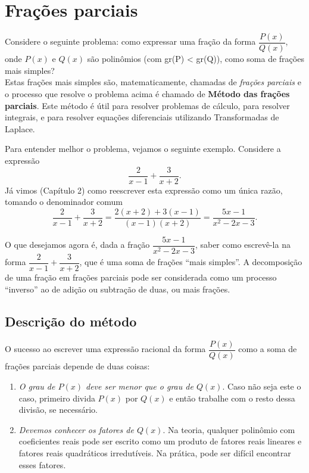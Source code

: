 \chapter{Frações parciais}

Considere o seguinte problema:  como expressar uma fração da forma $\dfrac{P(x)}{Q(x)}$, onde $P(x)$ e $Q(x)$ são polinômios (com gr(P) < gr(Q)), como soma de frações mais simples? \\

Estas frações mais simples são, matematicamente, chamadas de \textit{frações parciais} e o processo que resolve o problema acima é chamado de \textbf{Método das frações parciais}. Este método é útil para resolver problemas de cálculo, para resolver integrais, e para resolver equações diferenciais utilizando Transformadas de Laplace. 

Para entender melhor o problema, vejamos o seguinte exemplo. Considere a expressão
\begin{equation*}
    \frac{2}{x-1}+\frac{3}{x+2}.
\end{equation*}
Já vimos (Capítulo 2) como reescrever esta expressão como um única razão, tomando o denominador comum
\begin{equation*}
    \frac{2}{x-1}+\frac{3}{x+2} = \frac{2(x+2)+3(x-1)}{(x-1)(x+2)} = 
    \frac{5x-1}{x^2 - 2x - 3}.
\end{equation*}

O que desejamos agora é, dada a fração $\dfrac{5x-1}{x^2 - 2x - 3}$, saber como escrevê-la na forma $ \dfrac{2}{x-1}+\dfrac{3}{x+2}$, que é uma soma de frações ``mais simples''. A decomposição de uma fração em frações parciais pode ser considerada como um processo ``inverso'' ao de adição ou subtração de duas, ou mais frações.

\section{Descrição do método}

O sucesso ao escrever uma expressão racional da forma $\dfrac{P(x)}{Q(x)}$ como a soma de frações parciais depende de duas coisas:
\begin{enumerate}
\item \textit{O grau de $P(x)$ deve ser menor que o grau de $Q(x)$}. Caso não seja este o caso, primeiro divida $P(x)$ por $Q(x)$ e então trabalhe com o resto dessa divisão, se necessário.

\item \textit{Devemos conhecer os fatores de $Q(x)$}. Na teoria, qualquer polinômio com coeficientes reais pode ser escrito como um produto de fatores reais lineares e fatores reais quadráticos irredutíveis. Na prática, pode ser difícil encontrar esses fatores.

\end{enumerate}

